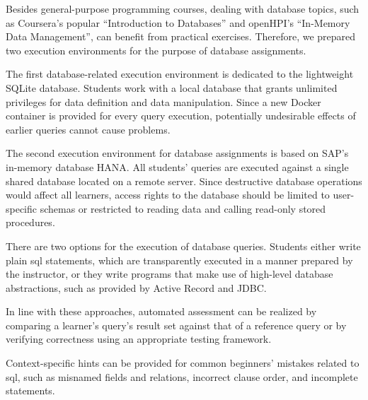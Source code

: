 Besides general-purpose programming courses, \moocs dealing with database topics, such as Coursera's popular ``Introduction to Databases'' and openHPI's ``In-Memory Data Management'', can benefit from practical exercises. Therefore, we prepared two execution environments for the purpose of database assignments.

The first database-related execution environment is dedicated to the lightweight SQLite database. Students work with a local database that grants unlimited privileges for data definition and data manipulation. Since a new Docker container is provided for every query execution, potentially undesirable effects of earlier queries cannot cause problems.

The second execution environment for database assignments is based on SAP's in-memory database HANA. All students' queries are executed against a single shared database located on a remote server. Since destructive database operations would affect all learners, access rights to the database should be limited to user-specific schemas or restricted to reading data and calling read-only stored procedures.

There are two options for the execution of database queries. Students either write plain \gls{sql} statements, which are transparently executed in a manner prepared by the instructor, or they write programs that make use of high-level database abstractions, such as provided by Active Record and JDBC.

In line with these approaches, automated assessment can be realized by comparing a learner's query's result set against that of a reference query or by verifying correctness using an appropriate testing framework.

Context-specific hints can be provided for common beginners' mistakes related to \gls{sql}, such as misnamed fields and relations, incorrect clause order, and incomplete statements.

